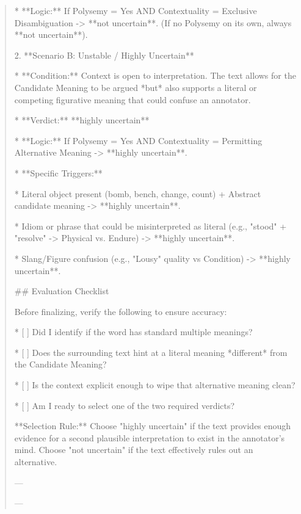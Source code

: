 \begin{quote}
    *   **Logic:** If Polysemy = Yes AND Contextuality = Exclusive Disambiguation -> **not uncertain**. (If no Polysemy on its own, always **not uncertain**).



2.  **Scenario B: Unstable / Highly Uncertain**

    *   **Condition:** Context is open to interpretation. The text allows for the Candidate Meaning to be argued *but* also supports a literal or competing figurative meaning that could confuse an annotator.

    *   **Verdict:** **highly uncertain**

    *   **Logic:** If Polysemy = Yes AND Contextuality = Permitting Alternative Meaning -> **highly uncertain**.

    *   **Specific Triggers:**

        *   Literal object present (bomb, bench, change, count) + Abstract candidate meaning -> **highly uncertain**.

        *   Idiom or phrase that could be misinterpreted as literal (e.g., "stood" + "resolve" -> Physical vs. Endure) -> **highly uncertain**.

        *   Slang/Figure confusion (e.g., "Lousy" quality vs Condition) -> **highly uncertain**.



## Evaluation Checklist

Before finalizing, verify the following to ensure accuracy:

*   [ ] Did I identify if the word has standard multiple meanings?

*   [ ] Does the surrounding text hint at a literal meaning *different* from the Candidate Meaning?

*   [ ] Is the context explicit enough to wipe that alternative meaning clean?

*   [ ] Am I ready to select one of the two required verdicts?



**Selection Rule:** Choose "highly uncertain" if the text provides enough evidence for a second plausible interpretation to exist in the annotator's mind. Choose "not uncertain" if the text effectively rules out an alternative.



---

---
\end{quote}
